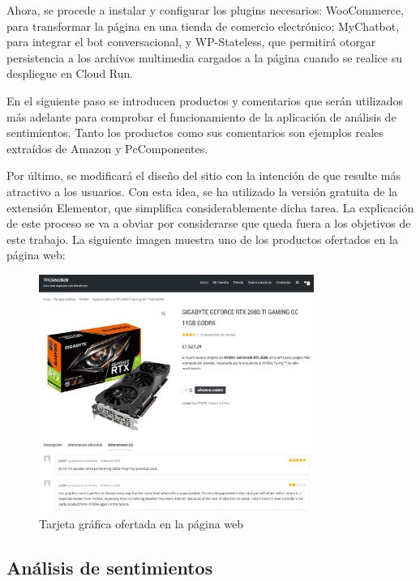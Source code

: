 Ahora, se procede a instalar y configurar los plugins necesarios: WooCommerce, para transformar la página en una tienda de comercio electrónico; MyChatbot, para integrar el bot conversacional, y WP-Stateless, que permitirá otorgar persistencia a los archivos multimedia cargados a la página cuando se realice su despliegue en Cloud Run.

En el siguiente paso se introducen productos y comentarios que serán utilizados más adelante para comprobar el funcionamiento de la aplicación de análisis de sentimientos. Tanto los productos como sus comentarios son ejemplos reales extraídos de Amazon y PcComponentes.

Por último, se modificará el diseño del sitio con la intención de que resulte más atractivo a los usuarios. Con esta idea, se ha utilizado la versión gratuita de la extensión Elementor, que simplifica considerablemente dicha tarea. La explicación de este proceso se va a obviar por considerarse que queda fuera a los objetivos de este trabajo. La siguiente imagen muestra uno de los productos ofertados en la página web:

\begin{figure}[ht]
	\begin{center}
		\includegraphics[width = 0.80\textwidth]{Figuras/tiendaWordpress.PNG}
	\end{center}
	\caption{\label{fig:tienda} Tarjeta gráfica ofertada en la página web}
\end{figure}
\newpage

\subsection{Análisis de sentimientos}

